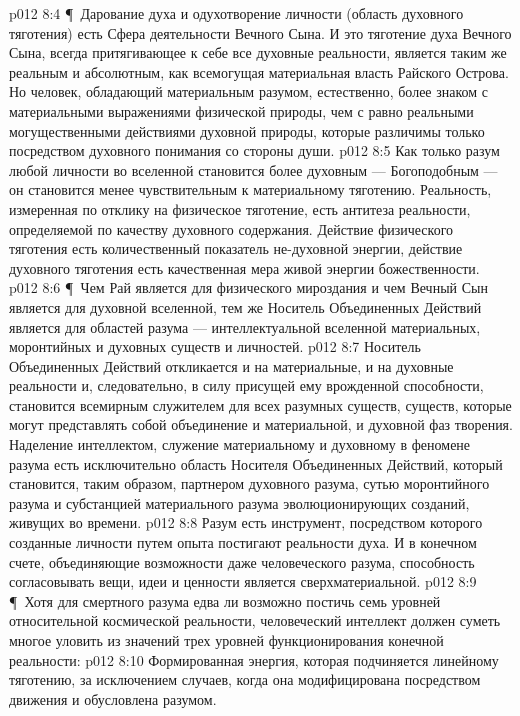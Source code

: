 \vs p012 8:4 \P\ Дарование духа и одухотворение личности (область духовного тяготения) есть Сфера деятельности Вечного Сына. И это тяготение духа Вечного Сына, всегда притягивающее к себе все духовные реальности, является таким же реальным и абсолютным, как всемогущая материальная власть Райского Острова. Но человек, обладающий материальным разумом, естественно, более знаком с материальными выражениями физической природы, чем с равно реальными могущественными действиями духовной природы, которые различимы только посредством духовного понимания со стороны души.
\vs p012 8:5 Как только разум любой личности во вселенной становится более духовным --- Богоподобным --- он становится менее чувствительным к материальному тяготению. Реальность, измеренная по отклику на физическое тяготение, есть антитеза реальности, определяемой по качеству духовного содержания. Действие физического тяготения есть количественный показатель не\hyp{}духовной энергии, действие духовного тяготения есть качественная мера живой энергии божественности.
\vs p012 8:6 \P\ Чем Рай является для физического мироздания и чем Вечный Сын является для духовной вселенной, тем же Носитель Объединенных Действий является для областей разума --- интеллектуальной вселенной материальных, моронтийных и духовных существ и личностей.
\vs p012 8:7 Носитель Объединенных Действий откликается и на материальные, и на духовные реальности и, следовательно, в силу присущей ему врожденной способности, становится всемирным служителем для всех разумных существ, существ, которые могут представлять собой объединение и материальной, и духовной фаз творения. Наделение интеллектом, служение материальному и духовному в феномене разума есть исключительно область Носителя Объединенных Действий, который становится, таким образом, партнером духовного разума, сутью моронтийного разума и субстанцией материального разума эволюционирующих созданий, живущих во времени.
\vs p012 8:8 Разум есть инструмент, посредством которого созданные личности путем опыта постигают реальности духа. И в конечном счете, объединяющие возможности даже человеческого разума, способность согласовывать вещи, идеи и ценности является сверхматериальной.
\vs p012 8:9 \P\ Хотя для смертного разума едва ли возможно постичь семь уровней относительной космической реальности, человеческий интеллект должен суметь многое уловить из значений трех уровней функционирования конечной реальности:
\vs p012 8:10 \bibnobreakspace {} Формированная энергия, которая подчиняется линейному тяготению, за исключением случаев, когда она модифицирована посредством движения и обусловлена разумом.
